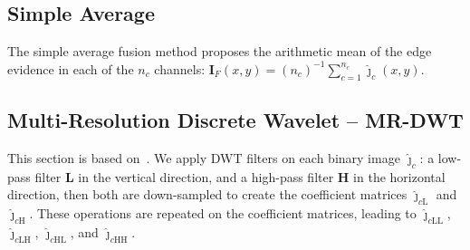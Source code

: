\documentclass[journal]{IEEEtran}
\begin{document}

\subsection{Simple Average}
The simple average fusion method proposes the arithmetic mean of the edge evidence in each of the $n_c$ channels:
$\bm I_F(x,y)=(n_c)^{-1}\sum_{c=1}^{n_c} \widehat{\bm\jmath}_c(x,y)$.

\subsection{Multi-Resolution Discrete Wavelet -- MR-DWT} 
This section is based on~\cite{n_r}.
We apply DWT filters on each binary image $\bm{\widehat\jmath}_c$: a low-pass filter $\bm L$ in the vertical direction, and a high-pass filter $\bm H$ in the horizontal direction, then both are down-sampled to create the coefficient matrices $\bm{\widehat\jmath}_{c\text{L}}$ and $\bm{\widehat\jmath}_{c\text{H}}$.
These operations are repeated on the coefficient matrices, leading to $\bm{\widehat\jmath}_{c\text{LL}}$, $\bm{\widehat\jmath}_{c\text{LH}}$, $\bm{\widehat\jmath}_{c\text{HL}}$, and $\bm{\widehat\jmath}_{c\text{HH}}$.
\end{document}
